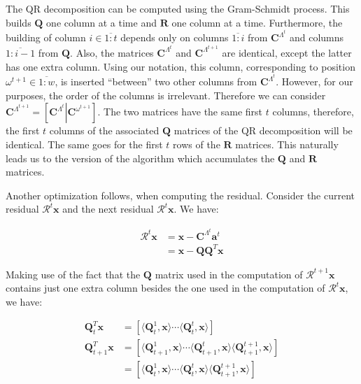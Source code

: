 \documentclass[12pt,a4paper,oneside,english]{UPBThesis}
\newcommand{\hcrange}[2]{\overline{{#1}\colon\!\!{#2}}}
\begin{document}
The QR decomposition can be computed using the Gram-Schmidt process. This builds $\textbf{Q}$ one column at a time and $\textbf{R}$ one column at a time. Furthermore, the building of column $i \in \hcrange{1}{t}$ depends only on columns $\hcrange{1}{i}$ from $\textbf{C}^{\Lambda^t}$ and columns $\hcrange{1}{i-1}$ from $\textbf{Q}$. Also, the matrices $\textbf{C}^{\Lambda^t}$ and $\textbf{C}^{\Lambda^{t+1}}$ are identical, except the latter has one extra column. Using our notation, this column, corresponding to position $\omega^{t+1} \in \hcrange{1}{w}$, is inserted ``between'' two other columns from $\textbf{C}^{\Lambda^t}$. However, for our purposes, the order of the columns is irrelevant. Therefore we can consider $\textbf{C}^{\Lambda^{t+1}} = \left[\textbf{C}^{\Lambda^t} \left|\right. \textbf{C}^{\omega^{t+1}} \right]$. The two matrices have the same first $t$ columns, therefore, the first $t$ columns of the associated $\textbf{Q}$ matrices of the QR decomposition will be identical. The same goes for the first $t$ rows of the $\textbf{R}$ matrices. This naturally leads us to the version of the algorithm which accumulates the $\textbf{Q}$ and $\textbf{R}$ matrices.

Another optimization follows, when computing the residual. Consider the current residual $\mathcal{R}^t\textbf{x}$ and the next residual $\mathcal{R}^t\textbf{x}$. We have:

\begin{align*}
\mathcal{R}^t\textbf{x} & = \textbf{x} - \textbf{C}^{\Lambda^t}\textbf{a}^t \\
& = \textbf{x} - \textbf{Q}\textbf{Q}^T\textbf{x}
\end{align*}

Making use of the fact that the $\textbf{Q}$ matrix used in the computation of $\mathcal{R}^{t+1}\textbf{x}$ contains just one extra column besides the one used in the computation of $\mathcal{R}^t\textbf{x}$, we have:

\begin{align*}
\textbf{Q}_t^T\textbf{x} & = [ \langle \textbf{Q}_t^1, \textbf{x} \rangle \cdots \langle \textbf{Q}_t^t, \textbf{x} \rangle ] \\
\textbf{Q}_{t+1}^T\textbf{x} & = [ \langle \textbf{Q}_{t+1}^1, \textbf{x} \rangle \cdots \langle \textbf{Q}_{t+1}^t, \textbf{x} \rangle \langle \textbf{Q}_{t+1}^{t+1}, \textbf{x} \rangle ] \\
& = [ \langle \textbf{Q}_t^1, \textbf{x} \rangle \cdots \langle \textbf{Q}_t^t, \textbf{x} \rangle \langle \textbf{Q}_{t+1}^{t+1}, \textbf{x} \rangle] \\
\end{align*}
\end{document}
